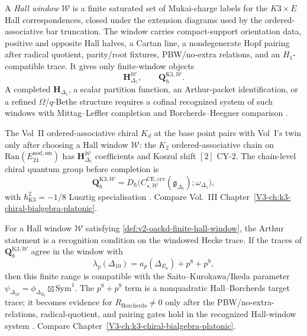 \begin{definition}
\label{def:v2-oackd-finite-hall-window}
A \emph{Hall window} $\mathcal W$ is a finite saturated set of
Mukai-charge labels for the $K3\times E$ Hall correspondences, closed
under the extension diagrams used by the ordered-associative bar
truncation.  The window carries compact-support orientation data,
positive and opposite Hall halves, a Cartan line, a nondegenerate Hopf
pairing after radical quotient, parity/root fixtures, PBW/no-extra
relations, and an $H_1$-compatible trace.  It gives only finite-window
objects
\[
\mathbf H_{\Delta_5}^{\mathcal W},\qquad
\mathbf Q_{\hbar}^{\mathrm{K3},\mathcal W}.
\]
A completed $\mathbf H_{\Delta_5}$, a scalar partition function, an
Arthur-packet identification, or a refined $\Omega$/$q$-Bethe structure
requires a cofinal recognized system of such windows with
Mittag--Leffler completion and Borcherds--Heegner comparison
\cite{kontsevich-soibelman,PTVV13,BBJ19,MaulikOkounkov12}.
\end{definition}

\begin{remark}
\label{rem:v2-oackd-1}
The Vol~II ordered-associative chiral $K_d$ at the base point
pairs with Vol~I's twin only after choosing a Hall window
$\mathcal W$: the $K_2$ ordered-associative chain on
$\mathrm{Ran}(E^{\mathrm{nod,sm}}_{24})$ has
$\mathbf H_{\Delta_5}^{\mathcal W}$ coefficients and Koszul shift
$[2]$ CY-$2$. The chain-level chiral quantum group before completion is
\[
\mathbf Q^{\mathrm{K3},\mathcal W}_\hbar
=D_\hbar\!\bigl(
C_{\star,\mathcal W}^{\mathrm{CE,crv}}(\mathfrak g_{\Delta_5});
\omega_{\Delta_5}
\bigr),
\]
with $\hbar^2_{\mathrm{K3}} = -1/8$ Lusztig specialisation
\cite{GritsenkoNikulin1998,Borcherds1992}. Compare Vol.~III
Chapter~\ref{V3-ch:k3-chiral-bialgebra-platonic}.
\end{remark}

\begin{remark}
\label{rem:v2-oackd-2}
For a Hall window $\mathcal W$ satisfying
\cref{def:v2-oackd-finite-hall-window}, the Arthur statement is a
recognition condition on the windowed Hecke trace.  If the traces of
$\mathbf Q^{\mathrm{K3},\mathcal W}_\hbar$ agree in the window with
\[
\lambda_p(\Delta_{10}) =
a_p(\Delta_{E_6}) + p^8 + p^9,
\]
then this finite range is compatible with the
Saito--Kurokawa/Ikeda parameter
$\psi_{\Delta_{10}}=\phi_{\Delta_{E_6}}\boxtimes\mathrm{Sym}^1$.
The $p^8+p^9$ term is a nonquadratic Hall--Borcherds target trace; it
becomes evidence for $R_{\mathrm{Borcherds}}\neq0$ only after the
PBW/no-extra-relations, radical-quotient, and pairing gates hold in the
recognized Hall-window system \cite{Andrianov1974,Ikeda2001}. Compare
Chapter~\ref{V3-ch:k3-chiral-bialgebra-platonic}.
\end{remark}

